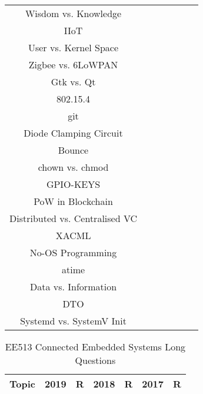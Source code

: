 \documentclass[a4paper]{article}
\begin{document}
\begin{table}[h]
\begin{tabular}{|c||c|c||c|c||c|c||}
			Wisdom vs. Knowledge & & & \checkmark & & \checkmark & \\
			IIoT & & & \checkmark & & & \\
			User vs. Kernel Space & & & \checkmark & & & \\
			Zigbee vs. 6LoWPAN & & & \checkmark & & \checkmark & \\
			Gtk vs. Qt & & & \checkmark & & & \\
			802.15.4 & & & \checkmark & & & \\
			git & & & \checkmark & & &\\
			Diode Clamping Circuit & & & & \checkmark & \checkmark & \\
			Bounce & & & & \checkmark & & \checkmark \\
			chown vs. chmod & & & \checkmark & & & \\
			GPIO-KEYS & & & & \checkmark & \checkmark & \checkmark \\
			PoW in Blockchain & & & & \checkmark & & \\
			Distributed vs. Centralised VC & & & & \checkmark &
			\checkmark & \\
			XACML & & & & \checkmark & & \\
			No-OS Programming & & & & & & \checkmark \\
			atime & & & & & & \checkmark \\
			Data vs. Information & & & & & & \checkmark \\
			DTO & & & & & & \checkmark \\
			Systemd vs. SystemV Init & & & & & & \checkmark \\
			\hline
			\hline
		\end{tabular}
	\end{table}
	\begin{table}[h]
		\centering
		\caption{EE513 Connected Embedded Systems Long Questions}
		\begin{tabular}{|c||c|c||c|c||c|c||}
			\hline
			\hline
			Topic & 2019 & R & 2018 & R & 2017 & R \\
			\hline
			\hline
			\hline
		\end{tabular}
	\end{table}
\end{document}

